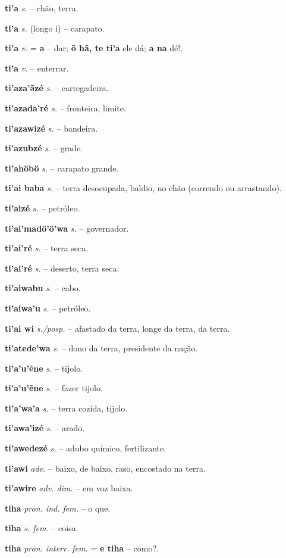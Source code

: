 \textbf{ti'a} \textit{s.} -- chão, terra.

\textbf{ti'a} \textit{s.} (longo i) -- carapato.

\textbf{ti'a} \textit{ v.} = \textbf{a} -- dar; \textbf{õ hã, te ti'a} ele dá; \textbf{a na} dé!.

\textbf{ti'a} \textit{ v.} -- enterrar.

\textbf{ti'aza'ãzé} \textit{s.} -- carregadeira.

\textbf{ti'azada'ré} \textit{s.} -- fronteira, limite.

\textbf{ti'azawizé} \textit{s.} -- bandeira.

\textbf{ti'azubzé} \textit{s.} -- grade.

\textbf{ti'ahöbö} \textit{s.} -- carapato grande.

\textbf{ti'ai baba} \textit{s.} -- terra desocupada, baldio, no chão (correndo ou arrastando).

\textbf{ti'aizé} \textit{s.} -- petróleo.

\textbf{ti'ai'madö'ö'wa} \textit{s.} -- governador.

\textbf{ti'ai'ré} \textit{s.} -- terra seca.

\textbf{ti'ai'ré} \textit{s.} -- deserto, terra seca.

\textbf{ti'aiwabu} \textit{s.} -- cabo.

\textbf{ti'aiwa'u} \textit{s.} -- petróleo.

\textbf{ti'ai wi} \textit{s./posp.} -- afastado da terra, longe da terra, da terra.

\textbf{ti'atede'wa} \textit{s.} -- dono da terra, presidente da nação.

\textbf{ti'a'u'ẽne} \textit{s.} -- tijolo.

\textbf{ti'a'u'ẽne} \textit{s.} -- fazer tijolo.

\textbf{ti'a'wa'a} \textit{s.} -- terra cozida, tijolo.

\textbf{ti'awa'izé} \textit{s.} -- arado.

\textbf{ti'awedezé} \textit{s.} -- adubo químico, fertilizante.

\textbf{ti'awi} \textit{adv.} -- baixo, de baixo, raso, encostado na terra.

\textbf{ti'awire} \textit{adv. dim.} -- em voz baixa.

\textbf{tiha} \textit{pron. ind. fem.} -- o que.

\textbf{tiha} \textit{s. fem.} -- coisa.

\textbf{tiha} \textit{pron. interr. fem.} = \textbf{e tiha} -- como?.

